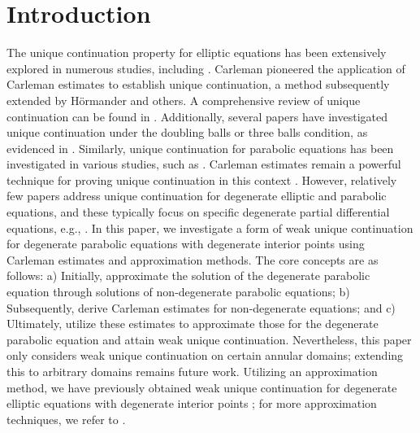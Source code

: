 \documentclass[11pt]{article}
\numberwithin{equation}{section}
\begin{document}
	\section{Introduction}
	
	 The unique continuation property for elliptic equations has been extensively explored in numerous studies, including \cite{Adolfsson,Brkri,Carleman,Garofalo2,Hormander,Kenig,Koch,Kukavica1,Kukavica2,Vessella1}. Carleman \cite{Carleman} pioneered the application of Carleman estimates to establish unique continuation, a method subsequently extended by H\"{o}rmander \cite{Hormander} and others. A comprehensive review of unique continuation can be found in \cite{Kenig}. Additionally, several papers have investigated unique continuation under the doubling balls or three balls condition, as evidenced in \cite{Kukavica1,Kukavica2}.
Similarly, unique continuation for parabolic equations has been investigated in various studies, such as \cite{Canuto,Escauriaza,FG,Lin,Phung,Vessella}. Carleman estimates remain a powerful technique for proving unique continuation in this context \cite{Canuto,Escauriaza,FG,Vessella}.
However, relatively few papers address unique continuation for degenerate elliptic and parabolic equations, and these typically focus on specific degenerate partial differential equations, e.g., \cite{Alabau,Banerjee,Garofalo,Wu}.
In this paper, we investigate a form of weak unique continuation for degenerate parabolic equations with degenerate interior points using Carleman estimates and approximation methods. The core concepts are as follows: a) Initially, approximate the solution of the degenerate parabolic equation through solutions of non-degenerate parabolic equations; b) Subsequently, derive Carleman estimates for non-degenerate equations; and c) Ultimately, utilize these estimates to approximate those for the degenerate parabolic equation and attain weak unique continuation. Nevertheless, this paper only considers weak unique continuation on certain annular domains; extending this to arbitrary domains remains future work. Utilizing an approximation method, we have previously obtained weak unique continuation for degenerate elliptic equations with degenerate interior points \cite{Wu1}; for more approximation techniques, we refer to \cite{Cora}.
\end{document}
